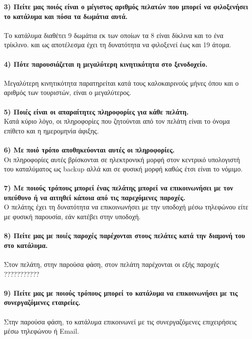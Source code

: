 \noindent
\textbf{3) Πείτε μας ποιός είναι ο μέγιστος αριθμός πελατών που μπορεί να φιλοξενήσει 
	το κατάλυμα και πόσα τα δωμάτια αυτά.} \\ \\
\noindent
Το κατάλυμα διαθέτει 9 δωμάτια εκ των οποίων τα 8 είναι δίκλινα και το ένα τρίκλινο.
και ως αποτέλεσμα έχει τη δυνατότητα να φιλοξενεί έως και 19 άτομα.\\ \\

\noindent
\textbf{4) Πότε παρουσιάζεται η μεγαλύτερη κινητικότητα στο ξενοδοχείο.} \\ \\
\noindent
Μεγαλύτερη κινητικότητα παρατηρείται κατά τους καλοκαιρινούς μήνες όπου 
και ο αριθμός των τουριστών, είναι ο μεγαλύτερος.\\ \\

\noindent
\textbf{5) Ποιές είναι οι απαραίτητες πληροφορίες για κάθε πελάτη.} \\
\noindent
Κατά κύριο λόγο, οι πληροφορίες που ζητούνται από τον πελάτη είναι 
το όνομα επίθετο και η ημερομηνία άφιξης. \\ \\

\noindent
\textbf{6) Με ποιό τρόπο αποθηκεύονται αυτές οι πληροφορίες.} \\
\noindent
Οι πληροφορίες αυτές βρίσκονται σε ηλεκτρονική μορφή στον κεντρικό υπολογιστή
του καταλύματος ως backup αλλά και σε φυσική μορφή καθώς έτσι είναι το νόμιμο. \\ \\

\noindent
\textbf{7) Με ποιούς τρόπους μπορεί ένας πελάτης μπορεί  να επικοινωνήσει 
	με τον υπεύθυνο ή να αιτηθεί κάποια από τις παρεχόμενες παροχές.} \\
\noindent
Ο πελάτης έχει τη δυνατότητα να επικοινωνήσει με την υποδοχή μέσω τηλεφώνου
είτε με φυσική παρουσία, εάν κατέβει στην υποδοχή.\\ \\

\noindent
\textbf{8) Πείτε μας με ποιές παροχές παρέχονται στους πελάτες κατά την διαμονή 
	του στο κατάλυμα.} \\ \\
\noindent
Στον πελάτη, στην παρούσα φάση, στον πελάτη παρέχονται οι εξής παροχές  ???????????\\ \\

\noindent
\textbf{9) Πείτε μας με ποιούς τρόπους μπορεί το κατάλυμα να επικοινωνήσει με τις 
	συνεργαζόμενες εταιρείες.} \\ \\
\noindent
Στην παρούσα φάση, το κατάλυμα επικοινωνεί με τις συνεργαζόμενες επιχειρήσεις
μέσω τηλεφώνου ή Email.\\ \\

